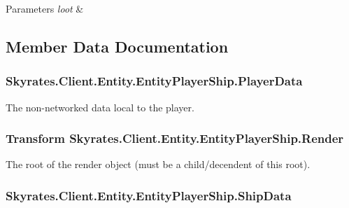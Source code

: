 \begin{DoxyParams}{Parameters}
{\em loot} & \\
\hline
\end{DoxyParams}


\subsection{Member Data Documentation}
\hypertarget{class_skyrates_1_1_client_1_1_entity_1_1_entity_player_ship_a775f40dd5d6c89a50325eaa9dbd605b8}{
\subsubsection[{Player\-Data}]{ Skyrates.\-Client.\-Entity.\-Entity\-Player\-Ship.\-Player\-Data}}\label{class_skyrates_1_1_client_1_1_entity_1_1_entity_player_ship_a775f40dd5d6c89a50325eaa9dbd605b8}


The non-\/networked data local to the player. 

\hypertarget{class_skyrates_1_1_client_1_1_entity_1_1_entity_player_ship_a47161ace6007067717ff46e5f45ec113}{
\subsubsection[{Render}]{\setlength{\rightskip}{0pt plus 5cm}Transform Skyrates.\-Client.\-Entity.\-Entity\-Player\-Ship.\-Render}}\label{class_skyrates_1_1_client_1_1_entity_1_1_entity_player_ship_a47161ace6007067717ff46e5f45ec113}


The root of the render object (must be a child/decendent of this root). 

\hypertarget{class_skyrates_1_1_client_1_1_entity_1_1_entity_player_ship_ab036683fcaa1c13312a06631dfff1b42}{
\subsubsection[{Ship\-Data}]{ Skyrates.\-Client.\-Entity.\-Entity\-Player\-Ship.\-Ship\-Data}}\label{class_skyrates_1_1_client_1_1_entity_1_1_entity_player_ship_ab036683fcaa1c13312a06631dfff1b42}



